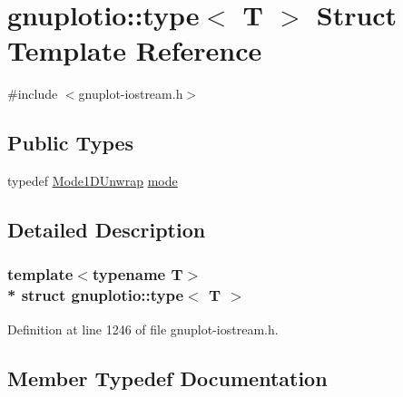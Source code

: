 \hypertarget{structgnuplotio_1_1_mode_auto_decoder_3_01_t_00_01typename_01boost_1_1enable__if__c_3_01_07_arra8faa7fb46cef74a29a23f22c000e4a99}{}\section{gnuplotio\+:\+:type$<$ T $>$ Struct Template Reference}
\label{structgnuplotio_1_1_mode_auto_decoder_3_01_t_00_01typename_01boost_1_1enable__if__c_3_01_07_arra8faa7fb46cef74a29a23f22c000e4a99}


{\ttfamily \#include $<$gnuplot-\/iostream.\+h$>$}

\subsection*{Public Types}
\begin{DoxyCompactItemize}
\item 
typedef \hyperlink{structgnuplotio_1_1_mode1_d_unwrap}{Mode1\+D\+Unwrap} \hyperlink{structgnuplotio_1_1_mode_auto_decoder_3_01_t_00_01typename_01boost_1_1enable__if__c_3_01_07_arra8faa7fb46cef74a29a23f22c000e4a99_a9c16f714b67e1c4b38e5c7ff956e8acc}{mode}
\end{DoxyCompactItemize}


\subsection{Detailed Description}
\subsubsection*{template$<$typename T$>$\\*
struct gnuplotio\+::type$<$ T $>$}



Definition at line 1246 of file gnuplot-\/iostream.\+h.



\subsection{Member Typedef Documentation}
